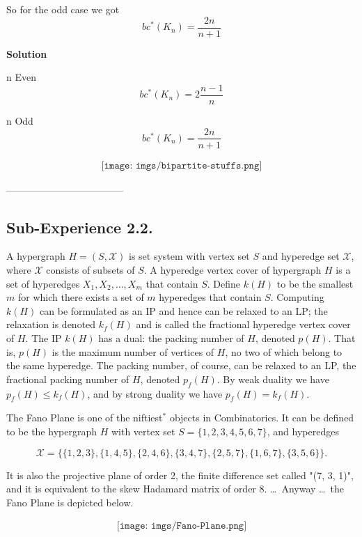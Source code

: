 \documentclass[10pt, AMS Euler]{article}
\begin{document}
So for the odd case we got \\

$$ bc^*(K_n) = \frac{2n}{n+1} $$

\textbf{Solution}

n Even \\
$$ bc^*(K_n) = 2\frac{n-1}{n} $$

n Odd \\
$$ bc^*(K_n) = \frac{2n}{n+1} $$

\begin{align*}
    \texttt{[image: imgs/bipartite-stuffs.png]}
\end{align*}

------------------------------------

\subsection*{Sub-Experience 2.2.}
A hypergraph $H = (S, \mathcal{X})$ is set system with vertex set $S$ and hyperedge set $\mathcal{X}$, where $\mathcal{X}$ consists of subsets of $S$. A hyperedge vertex cover of hypergraph $H$ is a set of hyperedges $X_1, X_2, \ldots, X_m$ that contain $S$. Define $k(H)$ to be the smallest $m$ for which there exists a set of $m$ hyperedges that contain $S$. Computing $k(H)$ can be formulated as an IP and hence can be relaxed to an LP; the relaxation is denoted $k_f(H)$ and is called the fractional hyperedge vertex cover of $H$. The IP $k(H)$ has a dual: the packing number of $H$, denoted $p(H)$. That is, $p(H)$ is the maximum number of vertices of $H$, no two of which belong to the same hyperedge. The packing number, of course, can be relaxed to an LP, the fractional packing number of $H$, denoted $p_f(H)$. By weak duality we have $p_f(H) \leq k_f(H)$, and by strong duality we have $p_f(H) = k_f(H)$.

The Fano Plane is one of the niftiest$^*$ objects in Combinatorics. It can be defined to be the hypergraph $H$ with vertex set $S = \{1, 2, 3, 4, 5, 6, 7\}$, and hyperedges

\[
\mathcal{X} = \bigl\{\{1, 2, 3\}, \{1, 4, 5\}, \{2, 4, 6\}, \{3, 4, 7\}, \{2, 5, 7\}, \{1, 6, 7\}, \{3, 5, 6\}\bigr\}.
\]

It is also the projective plane of order 2, the finite difference set called "(7, 3, 1)", and it is equivalent to the skew Hadamard matrix of order 8. \ldots\ Anyway \ldots\ the Fano Plane is depicted below.

\begin{align*}
    \texttt{[image: imgs/Fano-Plane.png]}
\end{align*}
\end{document}
